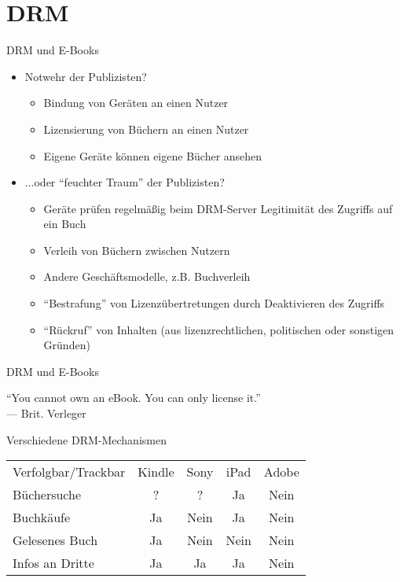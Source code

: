 \documentclass[hyperref={pdfpagelabels=false}]{beamer}
\begin{document}
\section{DRM}

\begin{frame}{DRM und E-Books}
	\begin{itemize}
		\item Notwehr der Publizisten?
		\begin{itemize}
			\item Bindung von Geräten an einen Nutzer
			\item Lizensierung von Büchern an einen Nutzer
			\item Eigene Geräte können eigene Bücher ansehen
		\end{itemize}
		\item<2-> ...oder "`feuchter Traum"' der Publizisten?
		\begin{itemize}
			\item<2-> Geräte prüfen regelmäßig beim DRM-Server Legitimität des Zugriffs auf ein Buch
			\item<2-> Verleih von Büchern zwischen Nutzern
			\item<2-> Andere Geschäftsmodelle, z.B. Buchverleih
			\item<2-> "`Bestrafung"' von Lizenzübertretungen durch Deaktivieren des Zugriffs
			\item<2-> "`Rückruf"' von Inhalten (aus lizenzrechtlichen, politischen oder sonstigen Gründen)
		\end{itemize}
	\end{itemize}
\end{frame}

\begin{frame}{DRM und E-Books}
	\begin{block}{ }
		"`You cannot own an eBook. You can only license it."' \\
		--- Brit. Verleger
	\end{block}
\end{frame}


\newcommand{\cellyes}{\cellcolor{red}Ja}
\newcommand{\cellunknown}{\cellcolor{yellow}?}
\newcommand{\cellno}{\cellcolor{green}Nein}

\begin{frame}{Verschiedene DRM-Mechanismen}
	\begin{tabular}{lcccc}
	Verfolgbar/Trackbar & Kindle & Sony & iPad & Adobe \\
	Büchersuche & \cellunknown & \cellunknown & \cellyes & \cellno \\
	Buchkäufe & \cellyes & \cellno & \cellyes & \cellno \\
	Gelesenes Buch & \cellyes & \cellno & \cellno & \cellno \\
	Infos an Dritte & \cellyes & \cellyes & \cellyes & \cellno \\
	\end{tabular}
\end{frame}
\end{document}
